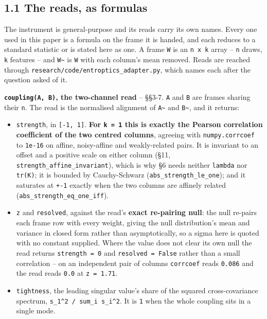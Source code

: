 \documentclass[10pt,letterpaper,twocolumn]{article}
\providecommand{\tightlist}{\setlength{\itemsep}{0pt}\setlength{\parskip}{0pt}}
\begin{document}
\subsection{1.1 The reads, as formulas}\label{11-the-reads-as-formulas}

The instrument is general-purpose and its reads carry its own names. Every one used in this paper
is a formula on the frame it is handed, and each reduces to a standard statistic or is stated here
as one. A frame \texttt{W} is an \texttt{n\ x\ k} array -- \texttt{n} draws, \texttt{k} features -- and \texttt{W\textasciitilde{}} is \texttt{W} with each
column's mean removed. Reads are reached through \texttt{research/\allowbreak{}code/\allowbreak{}entroptics\_\allowbreak{}adapter.\allowbreak{}py}, which names
each after the question asked of it.

\textbf{\texttt{coupling(\allowbreak{}A,\allowbreak{}\ B)\allowbreak{}}, the two-channel read} -- §§3-7. \texttt{A} and \texttt{B} are frames sharing their \texttt{n}. The
read is the normalised alignment of \texttt{A\textasciitilde{}} and \texttt{B\textasciitilde{}}, and it returns:

\begin{itemize}
\tightlist
\item
  \texttt{strength}, in \texttt{[\allowbreak{}-{}\allowbreak{}1,\allowbreak{}\ 1]\allowbreak{}}. \textbf{For \texttt{k\ =\allowbreak{}\ 1} this is exactly the Pearson correlation coefficient of
  the two centred columns}, agreeing with \texttt{numpy.\allowbreak{}corrcoef} to \texttt{1e-{}\allowbreak{}16} on affine, noisy-affine
  and weakly-related pairs. It is invariant to an offset and a positive scale on either column
  (§11, \texttt{strength\_\allowbreak{}affine\_\allowbreak{}invariant}), which is why §6 needs neither \texttt{lambda} nor \texttt{tr(\allowbreak{}K)\allowbreak{}}; it is
  bounded by Cauchy-Schwarz (\texttt{abs\_\allowbreak{}strength\_\allowbreak{}le\_\allowbreak{}one}); and it saturates at \texttt{+\allowbreak{}-{}\allowbreak{}1} exactly when the
  two columns are affinely related (\texttt{abs\_\allowbreak{}strength\_\allowbreak{}eq\_\allowbreak{}one\_\allowbreak{}iff}).
\item
  \texttt{z} and \texttt{resolved}, against the read's \textbf{exact re-pairing null}: the null re-pairs each frame
  row with every weight, giving the null distribution's mean and variance in closed form rather
  than asymptotically, so a sigma here is quoted with no constant supplied. Where the value does
  not clear its own null the read returns \texttt{strength\ =\allowbreak{}\ 0} and \texttt{resolved\ =\allowbreak{}\ False} rather than a
  small correlation -- on an independent pair of columns \texttt{corrcoef} reads \texttt{0.\allowbreak{}086} and the read
  reads \texttt{0.\allowbreak{}0} at \texttt{z\ =\allowbreak{}\ 1.\allowbreak{}71}.
\item
  \texttt{tightness}, the leading singular value's share of the squared cross-covariance spectrum,
  \texttt{s\_\allowbreak{}1\^{}2\ /\allowbreak{}\ sum\_\allowbreak{}i\ s\_\allowbreak{}i\^{}2}. It is \texttt{1} when the whole coupling sits in a single mode.
\end{itemize}
\end{document}
